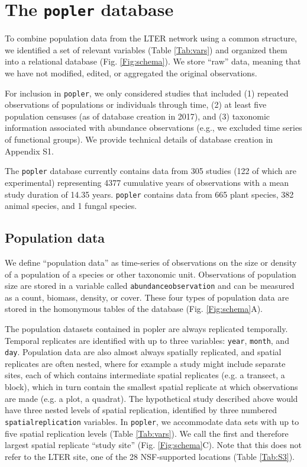 \documentclass{article}\usepackage[]{graphicx}\usepackage[]{color}
\begin{document}
\section*{The \texttt{popler} database}
To combine population data from the LTER network using a common structure, we identified a set of relevant variables (Table \ref{Tab:vars}) and organized them into a relational database (Fig. \ref{Fig:schema}). We store ``raw'' data, meaning that we have not modified, edited, or aggregated the original observations. 

For inclusion in \texttt{popler}, we only considered studies that included (1) repeated observations of populations or individuals through time, (2) at least five population censuses (as of database creation in 2017), and (3) taxonomic information associated with abundance observations (e.g., we excluded time series of functional groups). We provide technical details of database creation in Appendix S1.


The \texttt{popler} database currently contains data from 305 studies (122 of which are experimental) representing 4377 cumulative years of observations with a mean study duration of 14.35 years. \texttt{popler} contains data from 665 plant species, 382 animal species, and 1 fungal species.

\subsection*{Population data}
We define ``population data'' as time-series of observations on the size or density of a population of a species or other taxonomic unit. Observations of population size are stored in a variable called \texttt{abundance\textunderscore observation} and can be measured as a count, biomass, density, or cover. These four types of population data are stored in the homonymous tables of the database (Fig. \ref{Fig:schema}A).

The population datasets contained in popler are always replicated temporally. Temporal replicates are identified with up to three variables: \texttt{year}, \texttt{month}, and \texttt{day}. Population data are also almost always spatially replicated, and spatial replicates are often nested, where for example a study might include separate sites, each of which contains intermediate spatial replicates (e.g. a transect, a block), which in turn contain the smallest spatial replicate at which observations are made (e.g. a plot, a quadrat). The hypothetical study described above would have three nested levels of spatial replication, identified by three numbered \texttt{spatial\textunderscore replication} variables. In \texttt{popler}, we accommodate data sets with up to five spatial replication levels (Table \ref{Tab:vars}). We call the first and therefore largest spatial replicate ``study site'' (Fig. \ref{Fig:schema}C). Note that this does not refer to the LTER site, one of the 28 NSF-supported locations (Table \ref{Tab:S3}).
\end{document}
